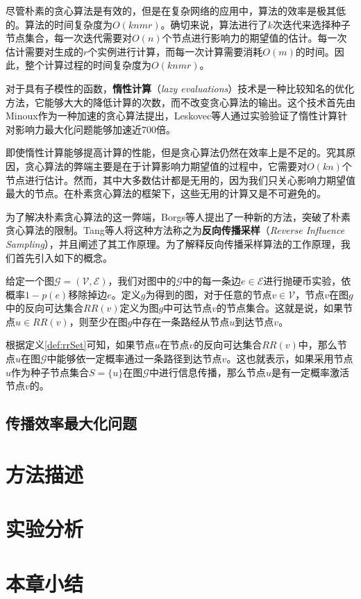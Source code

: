 尽管朴素的贪心算法是有效的，但是在复杂网络的应用中，算法的效率是极其低的。算法的时间复杂度为$O\left(knmr\right)$。确切来说，算法进行了$k$次迭代来选择种子节点集合，每一次迭代需要对$O\left(n\right)$个节点进行影响力的期望值的估计。每一次估计需要对生成的$r$个实例进行计算，而每一次计算需要消耗$O\left(m\right)$的时间。因此，整个计算过程的时间复杂度为$O\left(knmr\right)$。

对于具有子模性的函数，\textbf{惰性计算}（\textit{lazy evaluations}）技术是一种比较知名的优化方法，它能够大大的降低计算的次数，而不改变贪心算法的输出。这个技术首先由Minoux作为一种加速的贪心算法提出，Leskovec等人通过实验验证了惰性计算针对影响力最大化问题能够加速近700倍。

即使惰性计算能够提高计算的性能，但是贪心算法仍然在效率上是不足的。究其原因，贪心算法的弊端主要是在于计算影响力期望值的过程中，它需要对$O\left(kn\right)$个节点进行估计。然而，其中大多数估计都是无用的，因为我们只关心影响力期望值最大的节点。在朴素贪心算法的框架下，这些无用的计算又是不可避免的。

为了解决朴素贪心算法的这一弊端，Borgs等人提出了一种新的方法，突破了朴素贪心算法的限制。Tang等人将这种方法称之为\textbf{反向传播采样}（\textit{Reverse Influence Sampling}），并且阐述了其工作原理。为了解释反向传播采样算法的工作原理，我们首先引入如下的概念。

\begin{defn}[反向可达集合]\label{def:rrSet}
给定一个图$\mathcal{G}=\left(\mathcal{V}, \mathcal{E}\right)$，我们对图中的$\mathcal{G}$中的每一条边$e \in \mathcal{E}$进行抛硬币实验，依概率$1-p\left(e\right)$移除掉边$e$。定义$g$为得到的图，对于任意的节点$v \in \mathcal{V}$，节点$v$在图$g$中的反向可达集合${RR}\left(v\right)$定义为图$g$中可达节点$v$的节点集合。这就是说，如果节点$u \in {RR}\left(v\right)$，则至少在图$g$中存在一条路经从节点$u$到达节点$v$。
\end{defn}

根据定义\ref{def:rrSet}可知，如果节点$u$在节点$v$的反向可达集合${RR}\left(v\right)$中，那么节点$u$在图$\mathcal{G}$中能够依一定概率通过一条路径到达节点$v$。这也就表示，如果采用节点$u$作为种子节点集合$S=\{u\}$在图$\mathcal{G}$中进行信息传播，那么节点$u$是有一定概率激活节点$v$的。

\subsection{传播效率最大化问题}
\label{3subsec:efficiency}

\section{方法描述}
\label{3sec:method}

\section{实验分析}
\label{3sec:experiment}

\section{本章小结}
\label{3sec:conclusion}

